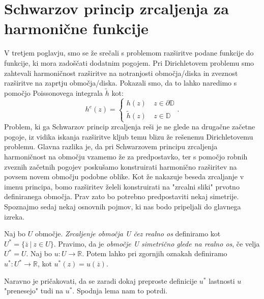 \documentclass[mat1]{fmfdelo}
\begin{document}
\section{Schwarzov princip zrcaljenja za harmonične funkcije}
    V tretjem poglavju, smo se že srečali s problemom razširitve podane funkcije do funkcije, ki mora zadoščati dodatnim pogojem. 
    Pri Dirichletovem problemu smo zahtevali harmoničnost razširitve na notranjosti območja/diska in zveznost razširitve na zaprtju območja/diska. 
    Pokazali smo, da to lahko naredimo s pomočjo Poissonovega integrala $\widetilde{h}$ kot:
    $$
        h^e(z) = 
        \begin{cases}
            h(z)~&z \in \partial \mathbb{D} \\
            \widetilde{h}(z)~&z \in \mathbb{D}
        \end{cases}.
    $$
    Problem, ki ga Schwarzov princip zrcaljenja reši je ne glede na drugačne začetne pogoje, iz vidika iskanja razširitve kljub temu blizu že rešenemu Dirichletovemu problemu.
    Glavna razlika je, da pri Schwarzovem principu zrcaljenja harmoničnost na območju vzamemo že za predpostavko, ter s pomočjo robnih zveznih začetnih pogojev poskušamo konstruirati harmonično razširitev na povsem novem območju podobne oblike.  
    Kot že nakazuje beseda zrcaljanje v imenu principa, bomo razširitev želeli konstruirati na "zrcalni sliki" prvotno definiranega območja. Prav zato bo potrebno predpostaviti nekaj simetrije.
    Spoznajmo sedaj nekaj osnovnih pojmov, ki nas bodo pripeljali do glavnega izreka.
    \begin{definicija}
        Naj bo $U$ območje. \emph{Zrcaljenje območja U čez realno os} definiramo kot $U^* = \{\overline{z}~|~z \in U\}$.
        \newline
        Pravimo, da je \emph{območje U simetrično glede na realno os}, če velja $U^* = U$.
        \newline
        Naj bo $u: U \to \mathbb{R}$. Potem lahko pri zgornjih oznakah definiramo $u^*: U^* \to \mathbb{R}$, kot $u^*(z) = u(\overline{z})$.
    \end{definicija}

    Naravno je pričakovati, da se zaradi dokaj preproste definicije $u^*$ lastnosti $u$ "prenesejo" tudi na $u^*$. 
    Spodnja lema nam to potrdi.
\end{document}
